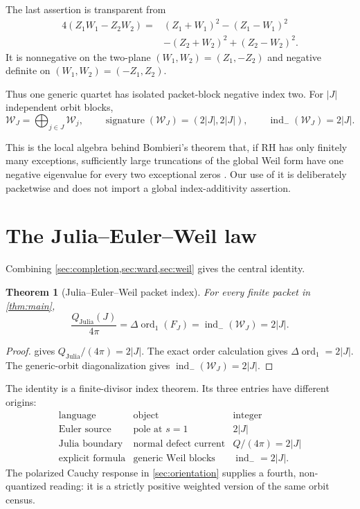 \documentclass[11pt]{article}
\newtheorem{theorem}{Theorem}[section]
\newcommand{\WW}{\mathcal W}
\newcommand{\ord}{\operatorname{ord}}
\newcommand{\indm}{\operatorname{ind}_{-}}
\begin{document}
The last assertion is transparent from
\[
\begin{aligned}
4(Z_1W_1-Z_2W_2)
={}&(Z_1+W_1)^2-(Z_1-W_1)^2\\
&-(Z_2+W_2)^2+(Z_2-W_2)^2.
\end{aligned}
\]
It is nonnegative on the two-plane
\((W_1,W_2)=(Z_1,-Z_2)\) and negative definite on
\((W_1,W_2)=(-Z_1,Z_2)\).

Thus one generic quartet has isolated packet-block negative index two.
For \(|J|\) independent orbit blocks,
\[
 \WW_J=\bigoplus_{j\in J}\WW_j,
 \qquad
 \operatorname{signature}(\WW_J)=(2|J|,2|J|),
 \qquad
 \indm(\WW_J)=2|J|.
\]

This is the local algebra behind Bombieri's theorem that, if RH has only
finitely many exceptions, sufficiently large truncations of the global
Weil form have one negative eigenvalue for every two exceptional zeros
\cite{Bombieri2000}.  Our use of it is deliberately packetwise and does
not import a global index-additivity assertion.

\section{The Julia--Euler--Weil law}
\label{sec:index}

Combining \cref{sec:completion,sec:ward,sec:weil} gives the central
identity.

\begin{theorem}[Julia--Euler--Weil packet index]
\label{thm:index}
For every finite packet in \cref{thm:main},
\[
\frac{Q_{\mathrm{Julia}}(J)}{4\pi}
=\Delta\ord_1(F_J)
=\indm(\WW_J)
=2|J|.
\]
\end{theorem}

\begin{proof}
 gives
\(Q_{\mathrm{Julia}}/(4\pi)=2|J|\).
The exact order calculation gives
\(\Delta\ord_1=2|J|\).
The generic-orbit diagonalization gives
\(\indm(\WW_J)=2|J|\).
\end{proof}

The identity is a finite-divisor index theorem.  Its three entries have
different origins:
\[
\begin{array}{c|c|c}
\text{language}&\text{object}&\text{integer}\\ \hline
\text{Euler source}&\text{pole at }s=1&2|J|\\
\text{Julia boundary}&\text{normal defect current}&Q/(4\pi)=2|J|\\
\text{explicit formula}&\text{generic Weil blocks}&\indm=2|J|.
\end{array}
\]
The polarized Cauchy response in \cref{sec:orientation} supplies a fourth,
non-quantized reading: it is a strictly positive weighted version of the
same orbit census.
\end{document}
